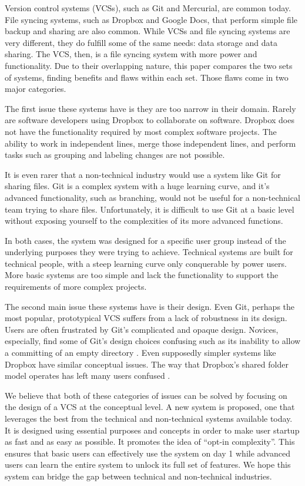 Version control systems (VCSs), such as Git and Mercurial, are common today. File syncing systems, such as Dropbox and Google Docs, that perform simple file backup and sharing are also common. While VCSs and file syncing systems are very different, they do fulfill some of the same needs: data storage and data sharing. The VCS, then, is a file syncing system with more power and functionality. Due to their overlapping nature, this paper compares the two sets of systems, finding benefits and flaws within each set. Those flaws come in two major categories.

The first issue these systems have is they are too narrow in their domain. Rarely are software developers using Dropbox to collaborate on software. Dropbox does not have the functionality required by most complex software projects. The ability to work in independent lines, merge those independent lines, and perform tasks such as grouping and labeling changes are not possible.

It is even rarer that a non-technical industry would use a system like Git for sharing files. Git is a complex system with a huge learning curve, and it's advanced functionality, such as branching, would not be useful for a non-technical team trying to share files. Unfortunately, it is difficult to use Git at a basic level without exposing yourself to the complexities of its more advanced functions.

In both cases, the system was designed for a specific user group instead of the underlying purposes they were trying to achieve. Technical systems are built for technical people, with a steep learning curve only conquerable by power users. More basic systems are too simple and lack the functionality to support the requirements of more complex projects.

The second main issue these systems have is their design. Even Git, perhaps the most popular, prototypical VCS suffers from a lack of robustness in its design. Users are often frustrated by Git's complicated and opaque design. Novices, especially, find some of Git's design choices confusing such as its inability to allow a committing of an empty directory \cite{RossoJackson}. Even supposedly simpler systems like Dropbox have similar conceptual issues. The way that Dropbox's shared folder model operates has left many users confused \cite{Zhang}.

We believe that both of these categories of issues can be solved by focusing on the design of a VCS at the conceptual level. A new system is proposed, one that leverages the best from the technical and non-technical systems available today. It is designed using essential purposes and concepts in order to make user startup as fast and as easy as possible. It promotes the idea of ``opt-in complexity''. This ensures that basic users can effectively use the system on day 1 while advanced users can learn the entire system to unlock its full set of features. We hope this system can bridge the gap between technical and non-technical industries. 

